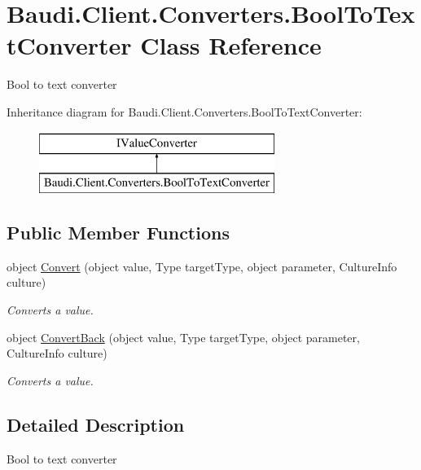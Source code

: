 \hypertarget{class_baudi_1_1_client_1_1_converters_1_1_bool_to_text_converter}{}\section{Baudi.\+Client.\+Converters.\+Bool\+To\+Text\+Converter Class Reference}
\label{class_baudi_1_1_client_1_1_converters_1_1_bool_to_text_converter}


Bool to text converter  


Inheritance diagram for Baudi.\+Client.\+Converters.\+Bool\+To\+Text\+Converter\+:\begin{figure}[H]
\begin{center}
\leavevmode
\includegraphics[height=2.000000cm]{class_baudi_1_1_client_1_1_converters_1_1_bool_to_text_converter}
\end{center}
\end{figure}
\subsection*{Public Member Functions}
\begin{DoxyCompactItemize}
\item 
object \hyperlink{class_baudi_1_1_client_1_1_converters_1_1_bool_to_text_converter_a96ce8ed8d9e8b57cdbc495ab6f989c67}{Convert} (object value, Type target\+Type, object parameter, Culture\+Info culture)
\begin{DoxyCompactList}\small\item\em Converts a value. \end{DoxyCompactList}\item 
object \hyperlink{class_baudi_1_1_client_1_1_converters_1_1_bool_to_text_converter_a8d824f4de35d9d41dfb873f8183c3820}{Convert\+Back} (object value, Type target\+Type, object parameter, Culture\+Info culture)
\begin{DoxyCompactList}\small\item\em Converts a value. \end{DoxyCompactList}\end{DoxyCompactItemize}


\subsection{Detailed Description}
Bool to text converter 



